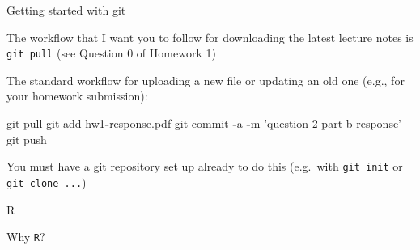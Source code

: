 \documentclass[ignorenonframetext,]{beamer}
\newenvironment{Shaded}{\begin{snugshade}}{\end{snugshade}}
\newcommand{\NormalTok}[1]{#1}
\newcommand{\OperatorTok}[1]{\textcolor[rgb]{0.81,0.36,0.00}{\textbf{#1}}}
\newcommand{\StringTok}[1]{\textcolor[rgb]{0.31,0.60,0.02}{#1}}
\begin{document}
\begin{frame}[fragile]{Getting started with git}
\protect\hypertarget{getting-started-with-git-1}{}

The workflow that I want you to follow for downloading the latest
lecture notes is \texttt{git\ pull} (see Question 0 of Homework 1)

The standard workflow for uploading a new file or updating an old one
(e.g., for your homework submission):

\begin{Shaded}
\begin{Highlighting}[]
\NormalTok{git pull}
\NormalTok{git add hw1}\OperatorTok{-}\NormalTok{response.pdf}
\NormalTok{git commit }\OperatorTok{-}\NormalTok{a }\OperatorTok{-}\NormalTok{m }\StringTok{'question 2 part b response'}
\NormalTok{git push}
\end{Highlighting}
\end{Shaded}

You must have a git repository set up already to do this (e.g.~with
\texttt{git\ init} or \texttt{git\ clone\ ...})

\end{frame}

\begin{frame}[fragile]{R}
\protect\hypertarget{r}{}

Why \texttt{R}?

\end{frame}
\end{document}
